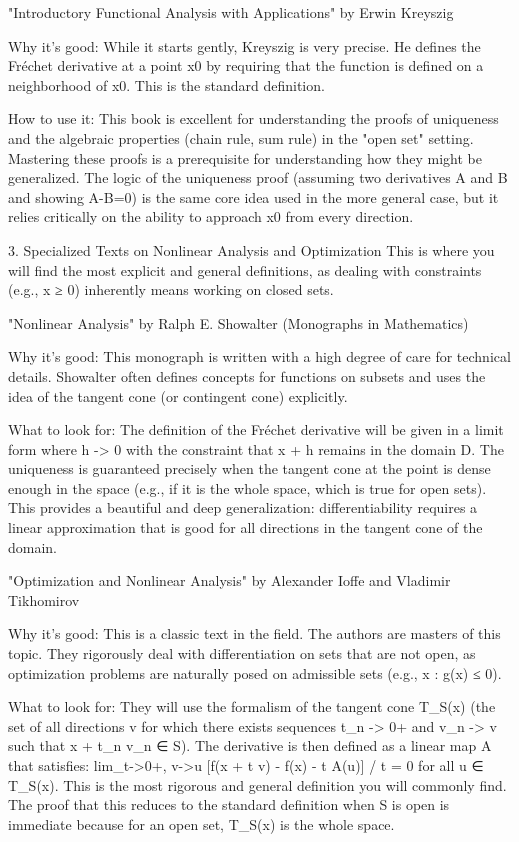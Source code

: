 \documentclass{book}
\begin{document}
"Introductory Functional Analysis with Applications" by Erwin Kreyszig

Why it's good: While it starts gently, Kreyszig is very precise. He defines the Fréchet derivative at a point x0 by requiring that the function is defined on a neighborhood of x0. This is the standard definition.

How to use it: This book is excellent for understanding the proofs of uniqueness and the algebraic properties (chain rule, sum rule) in the "open set" setting. Mastering these proofs is a prerequisite for understanding how they might be generalized. The logic of the uniqueness proof (assuming two derivatives A and B and showing A-B=0) is the same core idea used in the more general case, but it relies critically on the ability to approach x0 from every direction.

3. Specialized Texts on Nonlinear Analysis and Optimization
This is where you will find the most explicit and general definitions, as dealing with constraints (e.g., x ≥ 0) inherently means working on closed sets.

"Nonlinear Analysis" by Ralph E. Showalter (Monographs in Mathematics)

Why it's good: This monograph is written with a high degree of care for technical details. Showalter often defines concepts for functions on subsets and uses the idea of the tangent cone (or contingent cone) explicitly.

What to look for: The definition of the Fréchet derivative will be given in a limit form where h -> 0 with the constraint that x + h remains in the domain D. The uniqueness is guaranteed precisely when the tangent cone at the point is dense enough in the space (e.g., if it is the whole space, which is true for open sets). This provides a beautiful and deep generalization: differentiability requires a linear approximation that is good for all directions in the tangent cone of the domain.

"Optimization and Nonlinear Analysis" by Alexander Ioffe and Vladimir Tikhomirov

Why it's good: This is a classic text in the field. The authors are masters of this topic. They rigorously deal with differentiation on sets that are not open, as optimization problems are naturally posed on admissible sets (e.g., {x : g(x) ≤ 0}).

What to look for: They will use the formalism of the tangent cone T_S(x) (the set of all directions v for which there exists sequences t_n -> 0+ and v_n -> v such that x + t_n v_n ∈ S). The derivative is then defined as a linear map A that satisfies:
lim_{t->0+, v->u} [f(x + t v) - f(x) - t A(u)] / t = 0 for all u ∈ T_S(x).
This is the most rigorous and general definition you will commonly find. The proof that this reduces to the standard definition when S is open is immediate because for an open set, T_S(x) is the whole space.
\end{document}
